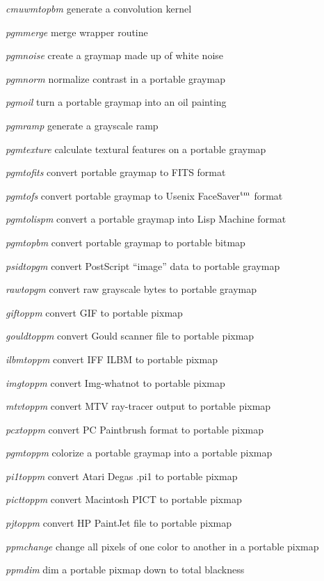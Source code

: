 \begin{TPlist}{{\it cmuwmtopbm}}
generate a convolution kernel
\item[{{\it pgmmerge}}]
merge wrapper routine
\item[{{\it pgmnoise}}]
create a graymap made up of white noise
\item[{{\it pgmnorm}}]
normalize contrast in a portable graymap
\item[{{\it pgmoil}}]
turn a portable graymap into an oil painting
\item[{{\it pgmramp}}]
generate a grayscale ramp
\item[{{\it pgmtexture}}]
calculate textural features on a portable graymap
\item[{{\it pgmtofits}}]
convert portable graymap to FITS format
\item[{{\it pgmtofs}}]
convert portable graymap to Usenix FaceSaver$^{\rm tm}$ format
\item[{{\it pgmtolispm}}]
convert a portable graymap into Lisp Machine format
\item[{{\it pgmtopbm}}]
convert portable graymap to portable bitmap
\item[{{\it psidtopgm}}]
convert PostScript ``image'' data to portable graymap
\item[{{\it rawtopgm}}]
convert raw grayscale bytes to portable graymap
\item[{{\it giftoppm}}]
convert GIF to portable pixmap
\item[{{\it gouldtoppm}}]
convert Gould scanner file to portable pixmap
\item[{{\it ilbmtoppm}}]
convert IFF ILBM to portable pixmap
\item[{{\it imgtoppm}}]
convert Img-whatnot to portable pixmap
\item[{{\it mtvtoppm}}]
convert MTV ray-tracer output to portable pixmap
\item[{{\it pcxtoppm}}]
convert PC Paintbrush format to portable pixmap
\item[{{\it pgmtoppm}}]
colorize a portable graymap into a portable pixmap
\item[{{\it pi1toppm}}]
convert Atari Degas .pi1 to portable pixmap
\item[{{\it picttoppm}}]
convert Macintosh PICT to portable pixmap
\item[{{\it pjtoppm}}]
convert HP PaintJet file to portable pixmap
\item[{{\it ppmchange}}]
change all pixels of one color to another in a portable pixmap
\item[{{\it ppmdim}}]
dim a portable pixmap down to total blackness

\end{TPlist}
